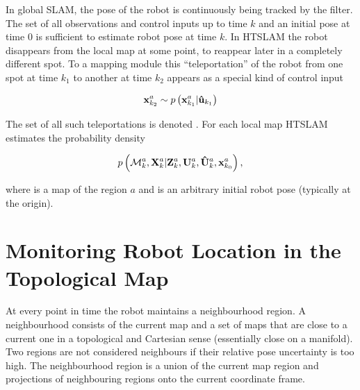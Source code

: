 In global SLAM, the pose of the robot is continuously being tracked by
the filter. The set of all observations and control inputs up to time
$k$ and an initial pose at time 0 is sufficient to estimate robot pose
at time $k$. In HTSLAM the robot disappears from the local map at some
point, to reappear later in a completely different spot. To a mapping
module this ``teleportation'' of the robot from one spot at time $k_1$
to another at time $k_2$ appears as a special kind of control input

$$
\x{k_2}{}{a} \sample{}{} \prob{\x{k_1}{}{a} | \Teleport{k_1}}
$$

The set of all such teleportations is denoted . For
each local map HTSLAM estimates the probability density

$$
\prob{\map{k}{}{a},\Xall{k}{}{a} | 
\Zall{k}{a},\Uall{k}{a},\TeleportAll{k}{a},\x{k_0}{}{a}},
$$

where  is a map of the region $a$ and  is an
arbitrary initial robot pose (typically at the origin).




\section{Monitoring Robot Location in the Topological Map}
\label{sec:topological_pose}

At every point in time the robot maintains a neighbourhood region. A
neighbourhood consists of the current map and a set of maps that are
close to a current one in a topological and Cartesian sense
(essentially close on a manifold). Two regions are not considered
neighbours if their relative pose uncertainty is too high. The
neighbourhood region is a union of the current map region and
projections of neighbouring regions onto the current coordinate frame.

